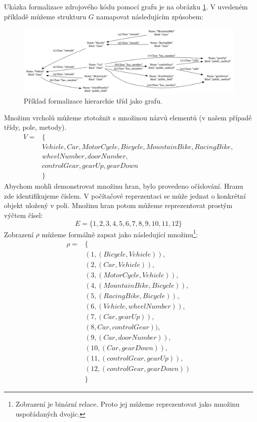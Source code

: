 Ukázka formalizace zdrojového kódu pomocí grafu je na obrázku \ref{design-graph_example}. V uvedeném příkladě můžeme strukturu $G$ namapovat následujícím způsobem:
\begin{figure}[h!]
  \centering
  \includegraphics[width=1.0\textwidth]{./graphs/graph_example.png}
  \caption{Příklad formalizace hierarchie tříd jako grafu.\label{design-graph_example}}
\end{figure}
Množinu vrcholů můžeme ztotožnit s množinou názvů elementů (v našem případě třídy, pole, metody).
\begin{align*}
V = &\{ \\
&Vehicle, Car, MotorCycle, Bicycle, MountainBike, RacingBike, \\
&wheelNumber, doorNumber, \\
&controlGear, gearUp, gearDown \\
&\}
\end{align*}
Abychom mohli demonstrovat množinu hran, bylo provedeno očíslování. Hranu zde identifikujeme číslem. V počítačové reprezentaci se může jednat o konkrétní objekt uložený v poli. Množinu hran potom můžeme reprezentovat prostým výčtem čísel:
\begin{displaymath}
E = \{1, 2, 3, 4, 5, 6, 7, 8, 9, 10, 11, 12\}
\end{displaymath}
Zobrazení $\rho$ můžeme formálně zapsat jako následující množinu\footnote{Zobrazení je binární relace. Proto jej můžeme reprezentovat jako množinu uspořádaných dvojic.}:
\begin{align*}
\rho = &\{ \\
&(1, (Bicycle, Vehicle)), \\
&(2, (Car, Vehicle)), \\
&(3, (MotorCycle, Vehicle)), \\
&(4, (MountainBike, Bicycle)), \\
&(5, (RacingBike, Bicycle)), \\
&(6, (Vehicle, wheelNumber)), \\
&(7, (Car, gearUp)), \\
&(8, Car, controlGear)), \\
&(9, (Car, doorNumber)), \\
&(10, (Car, gearDown)), \\
&(11, (controlGear, gearUp)), \\
&(12, (controlGear, gearDown)) \\
&\}
\end{align*}
